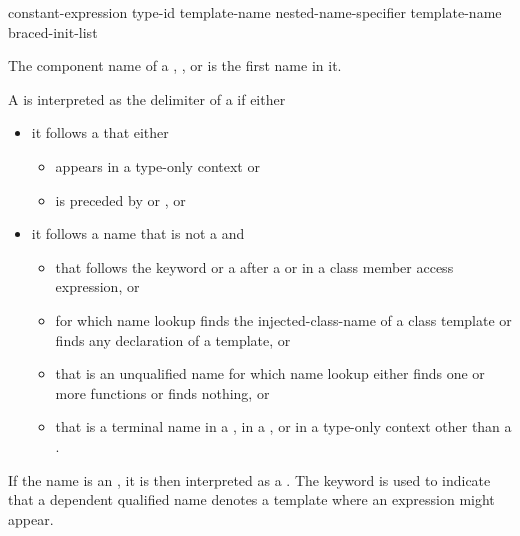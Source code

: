 \begin{bnf}
\br
  constant-expression\br
  type-id\br
   template-name\br
  nested-name-specifier  template-name\br
  braced-init-list
\end{bnf}

\pnum
{}%
The component name of a
,
, or
is the first name in it.

\pnum
A \tcode{<} is interpreted as the delimiter of
a 
if either
\begin{itemize}
\item
it follows a  that either
\begin{itemize}
\item appears in a type-only context or
\item is preceded by  or , or
\end{itemize}
\item
it follows a name that is not a  and
\begin{itemize}
\item
that follows the keyword  or a \tcode{\~}
after a  or
in a class member access expression, or
\item
for which name lookup finds the injected-class-name of a class template or
finds any declaration of a template, or
\item
that is an unqualified name
for which name lookup either finds one or more functions or finds nothing, or
\item
that is a terminal name
in a ,
in a , or
in a type-only context
other than a .
\end{itemize}
\end{itemize}
\begin{note}
If the name is an ,
it is then interpreted as a .
The keyword  is used to indicate
that a dependent qualified name denotes a template
where an expression might appear.
\end{note}
